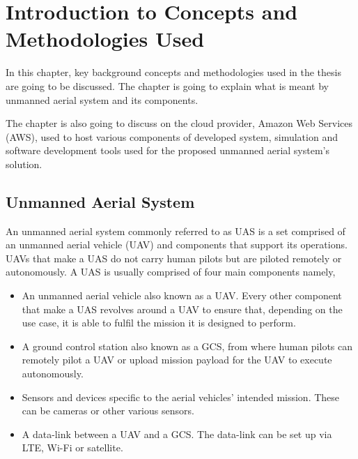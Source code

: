


\chapter{Introduction to Concepts and Methodologies Used}
\label{chap:theory}

In this chapter, key background concepts and methodologies used in the thesis are going to be discussed. The chapter is going to explain what is meant by unmanned aerial system and its components.

The chapter is also going to discuss on the cloud provider, Amazon Web Services (AWS), used to host various components of developed system, simulation and software development tools used for the proposed unmanned aerial system's solution.



\section{Unmanned Aerial System}
\label{sec:unmanned-aerial-system}

An unmanned aerial system commonly referred to as UAS is a set comprised of an unmanned aerial vehicle (UAV) and components that support its operations. UAVs that make a UAS do not carry human pilots but are piloted remotely or autonomously. A UAS is usually comprised of four main components namely,

\begin{itemize}
    \item An unmanned aerial vehicle also known as a UAV. Every other component that make a UAS revolves around a UAV to ensure that, depending on the use case, it is able to fulfil the mission it is designed to perform.
    \item A ground control station also known as a GCS, from where human pilots can remotely pilot a UAV or upload mission payload for the UAV to execute autonomously.
    \item Sensors and devices specific to the aerial vehicles' intended mission. These can be cameras or other various sensors.
    \item A data-link between a UAV and a GCS. The data-link can be set up via LTE, Wi-Fi or satellite.
\end{itemize}

